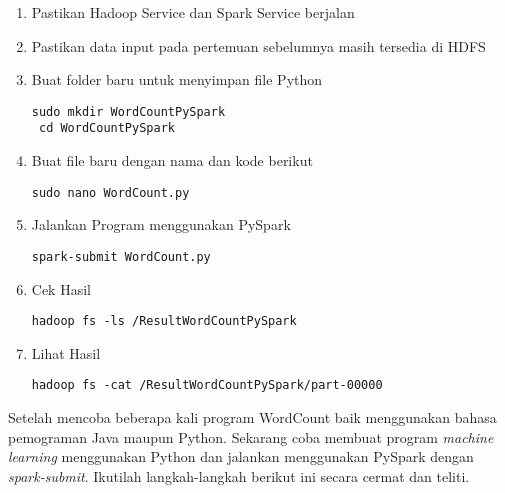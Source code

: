 \documentclass[a4paper]{tufte-handout}
\begin{document}
\hrulefill

\clearpage
{}

\begin{enumerate}
\item Pastikan Hadoop Service dan Spark Service berjalan
\item Pastikan data input pada pertemuan sebelumnya masih tersedia di HDFS
\item Buat folder baru untuk menyimpan file Python
\begin{lstlisting}[language=Terminal]
 sudo mkdir WordCountPySpark
 cd WordCountPySpark
\end{lstlisting}

\item Buat file baru dengan nama dan kode berikut
\begin{lstlisting}[language=Terminal]
 sudo nano WordCount.py
\end{lstlisting} 


\item Jalankan Program menggunakan PySpark
\begin{lstlisting}[language=Terminal]
 spark-submit WordCount.py
\end{lstlisting}

\item Cek Hasil
\begin{lstlisting}[language=Terminal]
 hadoop fs -ls /ResultWordCountPySpark
\end{lstlisting}

\item Lihat Hasil
\begin{lstlisting}[language=Terminal]
 hadoop fs -cat /ResultWordCountPySpark/part-00000
\end{lstlisting} 
\end{enumerate}


\hrulefill

\clearpage


Setelah mencoba beberapa kali program WordCount baik menggunakan bahasa pemograman Java maupun Python. Sekarang coba membuat program \textit{machine learning} menggunakan Python dan jalankan menggunakan PySpark dengan \textit{spark-submit}. Ikutilah langkah-langkah berikut ini secara cermat dan teliti.
\end{document}
